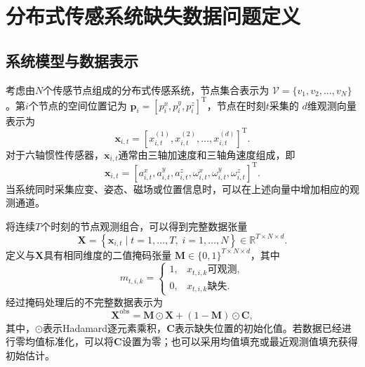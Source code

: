 \section{分布式传感系统缺失数据问题定义}

\subsection{系统模型与数据表示}

考虑由$N$个传感节点组成的分布式传感系统，节点集合表示为
$\mathcal{V}=\{v_1,v_2,\ldots,v_N\}$。第$i$个节点的空间位置记为
$\boldsymbol{p}_i=[p_i^x,p_i^y,p_i^z]^\mathrm{T}$，节点在时刻$t$采集的
$d$维观测向量表示为
\begin{equation}
    \boldsymbol{x}_{i,t}
    =
    \left[
    x_{i,t}^{(1)},x_{i,t}^{(2)},\ldots,x_{i,t}^{(d)}
    \right]^\mathrm{T}.
\end{equation}
对于六轴惯性传感器，$\boldsymbol{x}_{i,t}$通常由三轴加速度和三轴角速度组成，即
\begin{equation}
    \boldsymbol{x}_{i,t}
    =
    \left[
    a_{i,t}^{x},a_{i,t}^{y},a_{i,t}^{z},
    \omega_{i,t}^{x},\omega_{i,t}^{y},\omega_{i,t}^{z}
    \right]^\mathrm{T}.
\end{equation}
当系统同时采集应变、姿态、磁场或位置信息时，可以在上述向量中增加相应的观测通道。

将连续$T$个时刻的节点观测组合，可以得到完整数据张量
\begin{equation}
    \boldsymbol{X}
    =
    \left\{
    \boldsymbol{x}_{i,t}
    \mid t=1,\ldots,T,\;i=1,\ldots,N
    \right\}
    \in \mathbb{R}^{T\times N\times d}.
\end{equation}
定义与$\boldsymbol{X}$具有相同维度的二值掩码张量
$\boldsymbol{M}\in\{0,1\}^{T\times N\times d}$，其中
\begin{equation}
    m_{t,i,k}
    =
    \begin{cases}
        1, & x_{t,i,k}\text{可观测},\\
        0, & x_{t,i,k}\text{缺失}.
    \end{cases}
\end{equation}
经过掩码处理后的不完整数据表示为
\begin{equation}
    \boldsymbol{X}^{\mathrm{obs}}
    =
    \boldsymbol{M}\odot\boldsymbol{X}
    +(1-\boldsymbol{M})\odot\boldsymbol{C},
\end{equation}
其中，$\odot$表示Hadamard逐元素乘积，$\boldsymbol{C}$表示缺失位置的初始化值。若数据已经进行零均值标准化，可以将$\boldsymbol{C}$设置为零；也可以采用均值填充或最近观测值填充获得初始估计。


